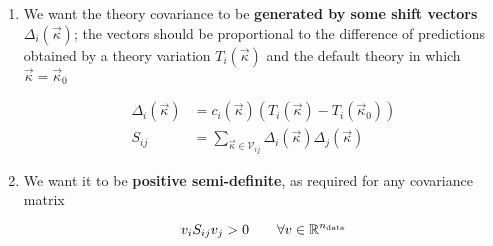 \begin{enumerate}[label=\Alph*.]
    \item We want the theory covariance to be \textbf{generated by some shift
        vectors} $\Delta_i(\vec{\kappa})$; the vectors should be proportional
        to the difference of predictions obtained by a theory variation
        $T_i(\vec{\kappa})$ and the default theory in which $\vec{\kappa} =
        \vec{\kappa}_0$

        \begin{align}
            \Delta_i(\vec{\kappa}) &= c_i(\vec{\kappa}) \left(T_i(\vec{\kappa}) - T_i(\vec{\kappa}_0)\right)
            \label{eq:shifts}\\
            S_{ij} &= \sum_{\vec{\kappa} \in \mathcal{V}_{ij}} \Delta_i(\vec{\kappa})\Delta_j(\vec{\kappa})
            \label{eq:thcovmat}
        \end{align}
    \item We want it to be \textbf{positive semi-definite}, as required for any
        covariance matrix

        \begin{equation}
            \label{eq:pos}
            v_i S_{ij} v_j > 0 \qquad \forall v \in \mathbb{R}^{n_{\text{data}}} 
        \end{equation}
\end{enumerate}
